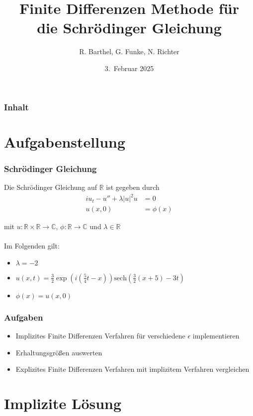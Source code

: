 \documentclass{beamer}
\author[Barthel, Funke, Richter]{R. Barthel, G. Funke, N. Richter}
\title[Finite Differenzen Methode f\"ur die Schr\"odinger Gleichung]{Finite Differenzen Methode f\"ur\\ die Schr\"odinger Gleichung}
\institute[Numerik-Praktikum 24/25]{Numerisches Praktikum\\
                    WS 2024/2025\\
                      Universit\"at Leipzig}
\date[WS 2025]{3.\ Februar 2025}
\begin{document}
\frame{\titlepage}

\begin{frame}
\frametitle{Inhalt}
\tableofcontents
\end{frame}

\section{Aufgabenstellung}

\begin{frame}
    \frametitle{Schrödinger Gleichung}

    Die Schrödinger Gleichung auf $\mathbb{R}$ ist gegeben durch
    \begin{align*}
        iu_t - u'' + \lambda |u|^2u &= 0 \\
        u(x,0) &= \phi(x)
    \end{align*}
    
    mit $u:\mathbb{R}\times\mathbb{R}\to\mathbb{C}$, $\phi:\mathbb{R}\to\mathbb{C}$ und $\lambda\in\mathbb{R}$\\
    \ \\
    Im Folgenden gilt:
    \begin{itemize}
        \item $\lambda = -2$
        \item $u(x,t)=\frac{3}{2}\exp(i(\frac{5}{4}t-x))\text{sech}(\frac{3}{2}(x+5)-3t)$
        \item $\phi(x)=u(x,0)$
    \end{itemize}
\end{frame}

\begin{frame}
    \frametitle{Aufgaben}
    \begin{itemize}
        \item Implizites Finite Differenzen Verfahren für verschiedene $\epsilon$ implementieren
        \item Erhaltungsgrößen auswerten
        \item Explizites Finite Differenzen Verfahren mit implizitem Verfahren vergleichen
    \end{itemize}
    
\end{frame}

\section{Implizite Lösung}
\end{document}

